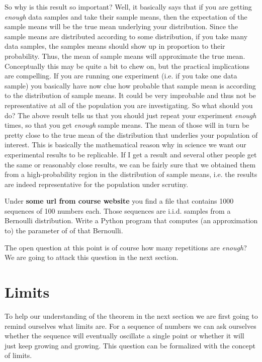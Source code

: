 So why is this result so important? Well, it basically says that if you are getting \textit{enough} data samples and take their sample means,
then the expectation of the sample means will be the true mean underlying your distribution. Since the sample means are distributed according
to some distribution, if you take many data samples, the samples means should show up in proportion to their probability. Thus, the mean
of sample means will approximate the true mean. Conceptually this may be quite a bit to chew on, but the practical implications are compelling.
If you are running one experiment (i.e. if you take one data sample) you basically have now clue how probable that sample mean is according
to the distribution of sample means. It could be very improbable and thus not be representative at all of the population you are investigating.
So what should you do? The above result tells us that you should just repeat your experiment \textit{enough} times, so that you get
\textit{enough} sample means. The mean of those will in turn be pretty close to the true mean of the distribution that underlies your population
of interest. This is basically the mathematical reason why in science we want our experimental results to be replicable. If I get a result
and several other people get the same or reasonably close results, we can be fairly sure that we obtained them from a high-probability region
in the distribution of sample means, i.e. the results are indeed representative for the population under scrutiny.

\begin{Exercise}
Under \textbf{some url from course website} you find a file that contains 1000 sequences of 100 numbers each. Those sequences are i.i.d.
samples from a Bernoulli distribution. Write a Python program that computes (an approximation to) the parameter of of that Bernoulli.
\end{Exercise}

The open question at this point is of course how many repetitions are \textit{enough}? We are going to attack this question in the next section.

\section{Limits}
To help our understanding of the theorem in the next section we are first going to remind ourselves what limits are. For a sequence of numbers
we can ask ourselves whether the sequence will eventually oscillate a single point or whether it will just keep growing and growing. This
question can be formalized with the concept of limits.

